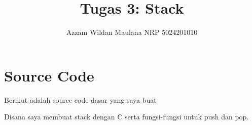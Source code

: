 \documentclass[]{article}
\title{Tugas 3: Stack}
\author{Azzam Wildan Maulana NRP 5024201010}
\begin{document}
{}
\maketitle

\section{Source Code}
Berikut adalah source code dasar yang saya buat

Disana saya membuat stack dengan C serta fungsi-fungsi untuk push dan pop.
\\
% 

% 
% 
% 
\end{document}
